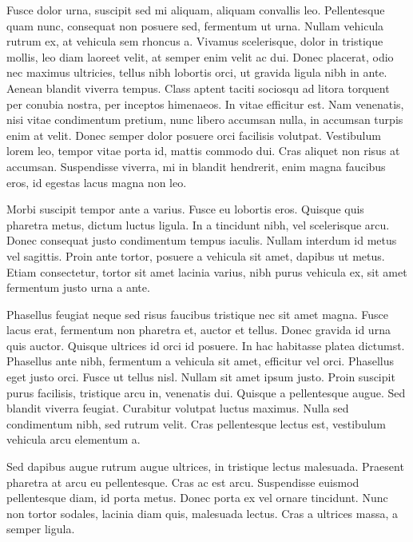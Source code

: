\documentclass[target=mst,aauheader=,style=]{thud}
\begin{document}
Fusce dolor urna, suscipit sed mi aliquam, aliquam convallis leo. Pellentesque quam nunc, consequat non posuere sed, fermentum ut urna. Nullam vehicula rutrum ex, at vehicula sem rhoncus a. Vivamus scelerisque, dolor in tristique mollis, leo diam laoreet velit, at semper enim velit ac dui. Donec placerat, odio nec maximus ultricies, tellus nibh lobortis orci, ut gravida ligula nibh in ante. Aenean blandit viverra tempus. Class aptent taciti sociosqu ad litora torquent per conubia nostra, per inceptos himenaeos. In vitae efficitur est. Nam venenatis, nisi vitae condimentum pretium, nunc libero accumsan nulla, in accumsan turpis enim at velit. Donec semper dolor posuere orci facilisis volutpat. Vestibulum lorem leo, tempor vitae porta id, mattis commodo dui. Cras aliquet non risus at accumsan. Suspendisse viverra, mi in blandit hendrerit, enim magna faucibus eros, id egestas lacus magna non leo.

Morbi suscipit tempor ante a varius. Fusce eu lobortis eros. Quisque quis pharetra metus, dictum luctus ligula. In a tincidunt nibh, vel scelerisque arcu. Donec consequat justo condimentum tempus iaculis. Nullam interdum id metus vel sagittis. Proin ante tortor, posuere a vehicula sit amet, dapibus ut metus. Etiam consectetur, tortor sit amet lacinia varius, nibh purus vehicula ex, sit amet fermentum justo urna a ante.

Phasellus feugiat neque sed risus faucibus tristique nec sit amet magna. Fusce lacus erat, fermentum non pharetra et, auctor et tellus. Donec gravida id urna quis auctor. Quisque ultrices id orci id posuere. In hac habitasse platea dictumst. Phasellus ante nibh, fermentum a vehicula sit amet, efficitur vel orci. Phasellus eget justo orci. Fusce ut tellus nisl. Nullam sit amet ipsum justo. Proin suscipit purus facilisis, tristique arcu in, venenatis dui. Quisque a pellentesque augue. Sed blandit viverra feugiat. Curabitur volutpat luctus maximus. Nulla sed condimentum nibh, sed rutrum velit. Cras pellentesque lectus est, vestibulum vehicula arcu elementum a.

Sed dapibus augue rutrum augue ultrices, in tristique lectus malesuada. Praesent pharetra at arcu eu pellentesque. Cras ac est arcu. Suspendisse euismod pellentesque diam, id porta metus. Donec porta ex vel ornare tincidunt. Nunc non tortor sodales, lacinia diam quis, malesuada lectus. Cras a ultrices massa, a semper ligula.




\appendix
\end{document}
